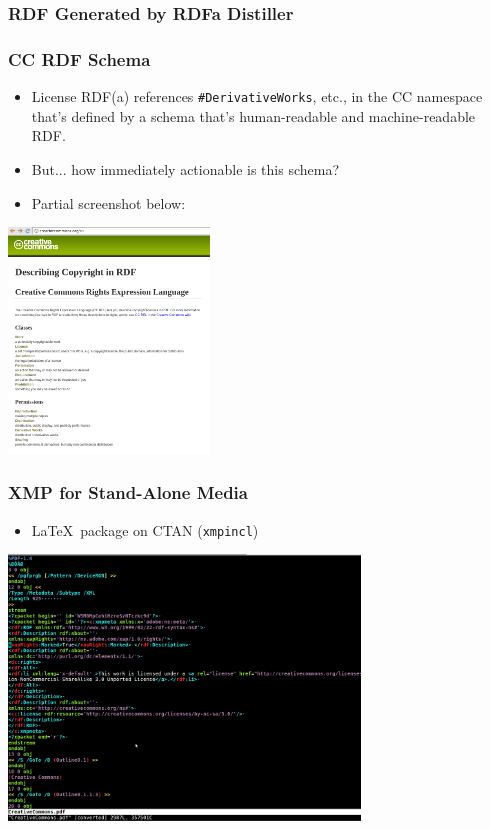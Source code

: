 \documentclass[mathserif,xcolor=dvipsnames,hyperref={bookmarks=true}]{beamer}
\begin{document}
\begin{frame}[fragile]
\frametitle{RDF Generated by RDFa Distiller}

\end{frame}

\begin{frame}[t]
\frametitle{CC RDF Schema}
        \begin{itemize}
            \item License RDF(a) references \texttt{\#DerivativeWorks}, etc., in the CC namespace that's defined by a schema that's human-readable and machine-readable RDF.
            \item But... how immediately actionable is this schema?
            \item Partial screenshot below:
        \end{itemize}
        \begin{center}
            \includegraphics[width=0.4\textwidth]{schema-screenshot1.png}
        \end{center}
\end{frame}

    \begin{frame}[t]
        \frametitle{XMP for Stand-Alone Media}
        \begin{itemize}
            \item \LaTeX\ package on CTAN (\texttt{xmpincl})
        \end{itemize}
        \begin{center}
            \includegraphics[width=0.7\textwidth]{embedded_xmp.png}
        \end{center}
    \end{frame}
\end{document}
